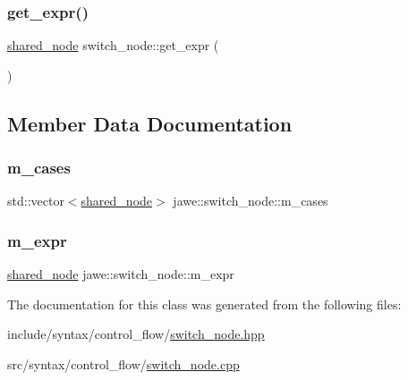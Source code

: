 \mbox{\label{classjawe_1_1switch__node_aa69da69f4352e215e711f094bd0d0e4a}} 
\subsubsection{\texorpdfstring{get\+\_\+expr()}{get\_expr()}}
{\footnotesize\ttfamily \hyperlink{namespacejawe_a3f307481d921b6cbb50cc8511fc2b544}{shared\+\_\+node} switch\+\_\+node\+::get\+\_\+expr (\begin{DoxyParamCaption}{ }\end{DoxyParamCaption})}



\subsection{Member Data Documentation}
\mbox{\label{classjawe_1_1switch__node_a36b6289496f08b71428eb4ce1dca1226}} 
\subsubsection{\texorpdfstring{m\+\_\+cases}{m\_cases}}
{\footnotesize\ttfamily std\+::vector$<$\hyperlink{namespacejawe_a3f307481d921b6cbb50cc8511fc2b544}{shared\+\_\+node}$>$ jawe\+::switch\+\_\+node\+::m\+\_\+cases\hspace{0.3cm}{\ttfamily [private]}}

\mbox{\label{classjawe_1_1switch__node_a716ea4d71332e08f8ca70151106b6340}} 
\subsubsection{\texorpdfstring{m\+\_\+expr}{m\_expr}}
{\footnotesize\ttfamily \hyperlink{namespacejawe_a3f307481d921b6cbb50cc8511fc2b544}{shared\+\_\+node} jawe\+::switch\+\_\+node\+::m\+\_\+expr\hspace{0.3cm}{\ttfamily [private]}}



The documentation for this class was generated from the following files\+:\begin{DoxyCompactItemize}
\item 
include/syntax/control\+\_\+flow/\hyperlink{switch__node_8hpp}{switch\+\_\+node.\+hpp}\item 
src/syntax/control\+\_\+flow/\hyperlink{switch__node_8cpp}{switch\+\_\+node.\+cpp}\end{DoxyCompactItemize}

